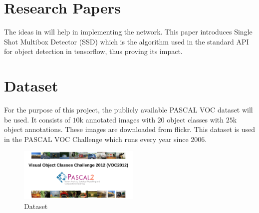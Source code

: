 \documentclass[12pt]{article}
\begin{document}
	\section*{Research Papers}
	The ideas in \cite{liu2016ssd} will help in implementing the network. This paper introduces Single Shot Multibox Detector (SSD) which is the algorithm used in the standard API for object detection in tensorflow, thus proving its impact. 
	
	\section*{Dataset}
	For the purpose of this project, the publicly available PASCAL VOC dataset will be used. It consists of $10$k annotated images with $20$ object classes with $25$k object annotations. These images are downloaded from flickr. This dataset is used in the PASCAL VOC Challenge which runs every year since 2006.  
	
	
	\begin{figure}[h]
		\centering
			\includegraphics[height=1in]{dataset.png}
		\caption{Dataset}
	\end{figure}
	
	
	
	
\end{document}
